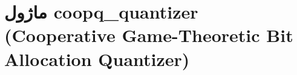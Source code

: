 \section{ماژول coopq\_quantizer (Cooperative Game-Theoretic Bit Allocation Quantizer)}
\label{sec:module_coopq_quantizer}
